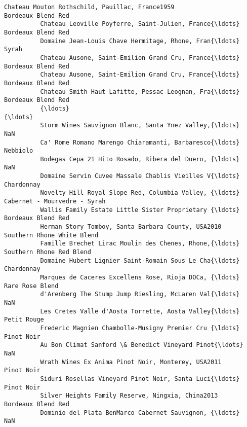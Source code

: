 \documentclass[11pt]{article}
\begin{document}
\begin{Verbatim}[commandchars=\\\{\}]
          Chateau Mouton Rothschild, Pauillac, France1959                      Bordeaux Blend Red   
          Chateau Leoville Poyferre, Saint-Julien, France{\ldots}                   Bordeaux Blend Red   
          Domaine Jean-Louis Chave Hermitage, Rhone, Fran{\ldots}                                Syrah   
          Chateau Ausone, Saint-Emilion Grand Cru, France{\ldots}                   Bordeaux Blend Red   
          Chateau Ausone, Saint-Emilion Grand Cru, France{\ldots}                   Bordeaux Blend Red   
          Chateau Smith Haut Lafitte, Pessac-Leognan, Fra{\ldots}                   Bordeaux Blend Red   
          {\ldots}                                                                                 {\ldots}   
          Storm Wines Sauvignon Blanc, Santa Ynez Valley,{\ldots}                                  NaN   
          Ca' Rome Romano Marengo Chiaramanti, Barbaresco{\ldots}                             Nebbiolo   
          Bodegas Cepa 21 Hito Rosado, Ribera del Duero, {\ldots}                                  NaN   
          Domaine Servin Cuvee Massale Chablis Vieilles V{\ldots}                           Chardonnay   
          Novelty Hill Royal Slope Red, Columbia Valley, {\ldots}         Cabernet - Mourvedre - Syrah   
          Wallis Family Estate Little Sister Proprietary {\ldots}                   Bordeaux Blend Red   
          Herman Story Tomboy, Santa Barbara County, USA2010           Southern Rhone White Blend   
          Famille Brechet Lirac Moulin des Chenes, Rhone,{\ldots}             Southern Rhone Red Blend   
          Domaine Hubert Lignier Saint-Romain Sous Le Cha{\ldots}                           Chardonnay   
          Marques de Caceres Excellens Rose, Rioja DOCa, {\ldots}                      Rare Rose Blend   
          d'Arenberg The Stump Jump Riesling, McLaren Val{\ldots}                                  NaN   
          Les Cretes Valle d'Aosta Torrette, Aosta Valley{\ldots}                          Petit Rouge   
          Frederic Magnien Chambolle-Musigny Premier Cru {\ldots}                           Pinot Noir   
          Au Bon Climat Sanford \& Benedict Vineyard Pinot{\ldots}                                  NaN   
          Wrath Wines Ex Anima Pinot Noir, Monterey, USA2011                           Pinot Noir   
          Siduri Rosellas Vineyard Pinot Noir, Santa Luci{\ldots}                           Pinot Noir   
          Silver Heights Family Reserve, Ningxia, China2013                    Bordeaux Blend Red   
          Dominio del Plata BenMarco Cabernet Sauvignon, {\ldots}                                  NaN   

\end{Verbatim}
\end{document}

